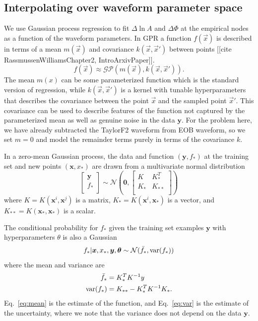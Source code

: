 \documentclass[prd,aps,letter,twocolumn,floatfix,notitlepage]{revtex4-1}
\begin{document}
\subsection{Interpolating over waveform parameter space}

We use Gaussian process regression to fit $\Delta\ln A$ and $\Delta\Phi$ at the empirical nodes as a function of
the waveform parameters. In GPR a function $f(\vec x)$ is described in terms of a mean $m(\vec x)$ and 
covariance $k(\vec x, \vec x')$ between points [[cite RassmussenWilliamsChapter2, IntroArxivPaper]].
\begin{equation}
f(\vec x) \approx \mathcal{GP}(m(\vec x), k(\vec x, \vec x')).
\end{equation}
The mean $m(x)$ can be some parameterized function which is the standard version of regression, 
while $k(\vec x, \vec x')$ is a kernel with tunable hyperparameters that describes the covariance between
the point $\vec x$ and the sampled point $\vec x'$. This covariance can be used to describe features of the function 
not captured by the parameterized mean as well as genuine noise in the data ${\bm y}$. 
For the problem here, we have already subtracted the 
TaylorF2 waveform from EOB waveform, so we set $m=0$ and model the remainder terms purely in terms 
of the covariance $k$. 

In a zero-mean Gaussian process, the data and function $({\bm y}, f_*)$ at the training set and new points $({\bm x}, x_*)$ are
drawn from a multivariate normal distribution
\begin{equation}
\label{eq:gaussian}
\begin{bmatrix}
{\bm y} \\
f_* \\
\end{bmatrix}
\sim \mathcal{N}
\left({\bm 0}, 
\begin{bmatrix}
K & K_*^T \\
K_* & K_{**} \\
\end{bmatrix}
\right)
\end{equation}
where $K = K({\bm x}^i, {\bm x}^j)$ is a matrix, $K_* = K({\bm x}^i, {\bm x}_*)$ is a vector, and $K_{**} = K({\bm x}_*, {\bm x}_*)$ is a scalar.

The conditional probability for $f_*$ given the training set examples ${\bm y}$ with hyperparameters $\theta$ is also a Gaussian
\begin{equation}
f_* | {\bm x}, x_*, {\bm y}, {\bm \theta} \sim \mathcal{N}(\bar f_*, {\rm var}(f_*))
\end{equation}
where the mean and variance are
\begin{align}
\label{eq:mean}
\bar f_* &= K_*^T K^{-1} y \\
\label{eq:var}
{\rm var}(f_*) &= K_{**} - K_*^T K^{-1} K_*.
\end{align}
Eq.~\eqref{eq:mean} is the estimate of the function, and Eq.~\eqref{eq:var} is the estimate of the uncertainty, where we note that the variance does not depend on the data $\bm{y}$.
\end{document}

